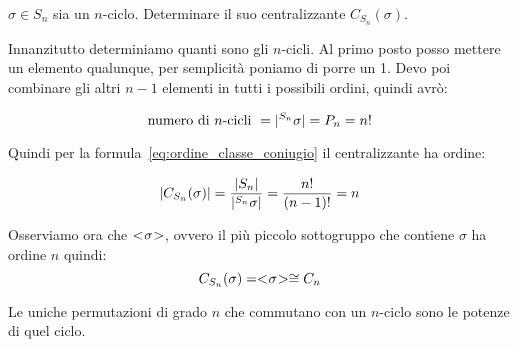 \begin{esercizio}
	$\sigma \in S_n$ sia un $n$-ciclo. Determinare il suo centralizzante $C_{S_n}(\sigma)$.
\end{esercizio}
\begin{soluzione}
	Innanzitutto determiniamo quanti sono gli $n$-cicli. Al primo posto posso mettere un elemento qualunque, per semplicità poniamo di porre un 1. Devo poi combinare gli altri $n-1$ elementi in tutti i possibili ordini, quindi avrò:
	
	\begin{equation}
		\text{numero di $n$-cicli } = \lvert ^{S_n}\sigma \rvert = P_n = n! 
	\end{equation}  

	Quindi per la formula~\eqref{eq:ordine_classe_coniugio} il centralizzante ha ordine:
	
	\begin{equation}
		\lvert C_{S_n}(\sigma) \rvert = \dfrac{\lvert S_n \rvert}{\lvert ^{S_n}\sigma \rvert} = \dfrac{n!}{(n-1)!} = n
	\end{equation}

	Osserviamo ora che $< \negmedspace \sigma \negmedspace >$, ovvero il più piccolo sottogruppo che contiene $\sigma$ ha ordine $n$ quindi:
	\begin{equation*}
		C_{S_n}(\sigma) = < \negmedspace \sigma \negmedspace > \cong C_n
	\end{equation*}

	Le uniche permutazioni di grado $n$ che commutano con un $n$-ciclo sono le potenze di quel ciclo.
\end{soluzione}

